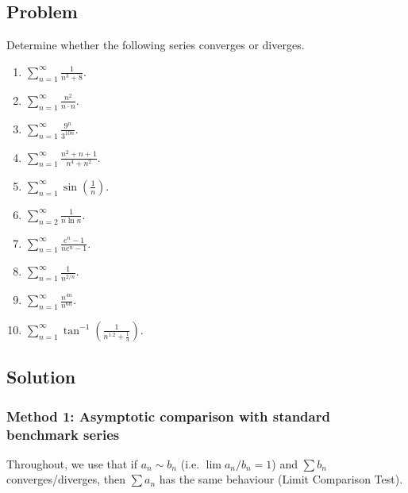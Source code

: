 \documentclass[12pt]{article}
\newcommand{\ds}{\displaystyle}
\begin{document}
\subsection*{Problem}
Determine whether the following series converges or diverges.
\begin{enumerate}[label=(\alph*)]
  \item \(\ds \sum_{n=1}^{\infty}\frac{1}{n^3+8}\).
  \item \(\ds \sum_{n=1}^{\infty}\frac{n^2}{n\cdot n}\).
  \item \(\ds \sum_{n=1}^{\infty}\frac{9^n}{3^{10n}}\).
  \item \(\ds \sum_{n=1}^{\infty}\frac{n^2+n+1}{n^4+n^2}\).
  \item \(\ds \sum_{n=1}^{\infty}\sin\!\left(\frac{1}{n}\right)\).
  \item \(\ds \sum_{n=2}^{\infty}\frac{1}{n\ln n}\).
  \item \(\ds \sum_{n=1}^{\infty}\frac{e^n-1}{n e^n-1}\).
  \item \(\ds \sum_{n=1}^{\infty}\frac{1}{n^{2/n}}\).
  \item \(\ds \sum_{n=1}^{\infty}\frac{n^{4n}}{n^{6n}}\).
  \item \(\ds \sum_{n=1}^{\infty}\tan^{-1}\!\left(\frac{1}{n^{1.2}+\tfrac13}\right)\).
\end{enumerate}

\subsection*{Solution}

\subsubsection*{Method 1: Asymptotic comparison with standard benchmark series}
Throughout, we use that if \(a_n\sim b_n\) (i.e. \(\lim a_n/b_n=1\)) and \(\sum b_n\) converges/diverges, then \(\sum a_n\) has the same behaviour (Limit Comparison Test).
\end{document}
